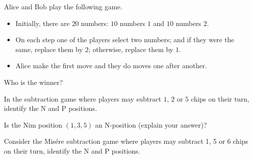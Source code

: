 \documentclass[addpoints,answers]{exam}
\begin{document}
    \pagestyle{headandfoot}
    \runningheadrule

    \firstpagefooter{}{}{}
    \runningfooter{}{}{}
    \begin{flushright}

        \vspace{0.2in}

    \end{flushright}

    \begin{questions}
        \question
            Alice and Bob play the following game.
            \begin{itemize}
                \item Initially, there are $20$ numbers: $10$ numbers $1$ and $10$ numbers
                    $2$.
                \item On each step one of the players select two numbers; and if they were
                    the same, replace them by $2$; otherwise, replace them by $1$.
                \item Alice make the first move and they do moves one after another.
            \end{itemize}
            Who is the winner?
            \begin{solutionorbox}[\stretch{1}]
            \end{solutionorbox}
            \newpage
 
        \question
            In the subtraction game where players may subtract $1$, $2$ or $5$ chips on
            their turn, identify the N and P positions.
            \begin{solutionorbox}[\stretch{1}]
            \end{solutionorbox}
            \newpage
 
        \question
            Is the Nim position $(1, 3, 5)$ an N-position (explain your answer)?
            \begin{solutionorbox}[\stretch{1}]
            \end{solutionorbox}
            \newpage
 
        \question
            Consider the Mis\'ere subtraction game where players may subtract 1, 5 or 6
            chips on their turn, identify the N and P positions.
            \begin{solutionorbox}[\stretch{1}]
            \end{solutionorbox}
            \newpage
 
\end{questions}
\end{document}
